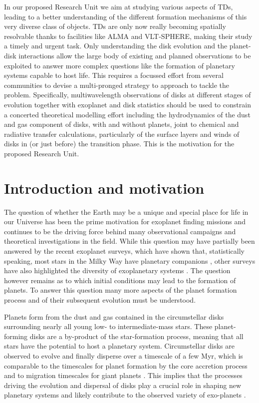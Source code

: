 \documentclass[10pt,fleqn,twoside,a4paper]{article}
\begin{document}
In our proposed Research Unit we aim at studying various aspects of
TDs, leading to a better understanding of the different formation
mechanisms of this very diverse class of objects. TDs are
only now really becoming spatially resolvable thanks
to facilities like ALMA and VLT-SPHERE, making their study a timely and
urgent task. Only understanding the disk evolution and the planet-disk
interactions allow the large body of existing and planned observations to be
exploited to answer more complex questions like the formation of planetary
systems capable to host life. This requires a focussed effort from
several communities to devise a multi-pronged strategy to approach to
tackle the problem. Specifically, multiwavelength observations of disks at
different stages of evolution together with exoplanet and disk statistics
should be used to constrain a concerted theoretical modelling effort
including the hydrodynamics of the dust and gas component of disks, with and
without planets, joint to chemical and radiative transfer calculations,
particularly of the surface layers and winds of disks in (or just
before) the transition phase. This is the motivation for the proposed Research Unit.


\section{Introduction and motivation}

The question of whether the Earth may be a unique and special place for life
in our Universe has been the prime motivation for exoplanet finding missions
and continues to be the driving force behind many observational campaigns and
theoretical investigations in the field. While this question may have
partially been answered by the recent exoplanet surveys, which have shown
 that, statistically speaking, most stars in the Milky Way have planetary
  companions \citep{2012Natur.481..167C}, other surveys have
also highlighted the diversity of exoplanetary systems \citep{2015ApJS..217...31M}. 
The question however remains as to which
initial conditions may lead to the formation of planets. To answer
this question many more aspects of the planet formation process and of their
subsequent evolution must be understood.

Planets form from the dust and gas contained in the circumstellar disks surrounding nearly all young low- to intermediate-mass stars. These planet-forming disks are a by-product of the star-formation process, meaning that all stars have the potential to host a planetary system.
Circumstellar disks are observed to evolve and finally disperse over a
timescale of a few Myr, which is comparable to
the timescales for planet formation by the core accretion process
 and to migration timescales for giant planets
\citep[see][for a review]{2011ARA&A..49..195A}. This implies that the processes driving the
evolution and dispersal of disks play a crucial role in shaping new
planetary systems and likely contribute to the observed variety of exo-planets
\citep[see e.g.,]{2012MNRAS.422L..82A, 2015MNRAS.450.3008E}.
\end{document}
